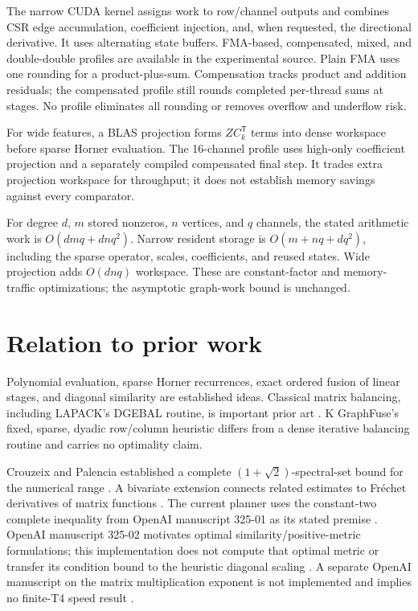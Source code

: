 \documentclass[10pt]{article}
\begin{document}
The narrow CUDA kernel assigns work to row/channel outputs and combines CSR edge accumulation, coefficient injection, and, when requested, the directional derivative. It uses alternating state buffers. FMA-based, compensated, mixed, and double-double profiles are available in the experimental source. Plain FMA uses one rounding for a product-plus-sum. Compensation tracks product and addition residuals; the compensated profile still rounds completed per-thread sums at stages. No profile eliminates all rounding or removes overflow and underflow risk.

For wide features, a BLAS projection forms $ZC_k^{\mathsf T}$ terms into dense workspace before sparse Horner evaluation. The 16-channel profile uses high-only coefficient projection and a separately compiled compensated final step. It trades extra projection workspace for throughput; it does not establish memory savings against every comparator.

For degree $d$, $m$ stored nonzeros, $n$ vertices, and $q$ channels, the stated arithmetic work is $O(dm q+d n q^2)$. Narrow resident storage is $O(m+nq+dq^2)$, including the sparse operator, scales, coefficients, and reused states. Wide projection adds $O(dnq)$ workspace. These are constant-factor and memory-traffic optimizations; the asymptotic graph-work bound is unchanged.

\section{Relation to prior work}

Polynomial evaluation, sparse Horner recurrences, exact ordered fusion of linear stages, and diagonal similarity are established ideas. Classical matrix balancing, including LAPACK's DGEBAL routine, is important prior art \cite{lapack}. K GraphFuse's fixed, sparse, dyadic row/column heuristic differs from a dense iterative balancing routine and carries no optimality claim.

Crouzeix and Palencia established a complete $(1+\sqrt{2})$-spectral-set bound for the numerical range \cite{crouzeixpalencia}. A bivariate extension connects related estimates to Fr\'echet derivatives of matrix functions \cite{crouzeixkressner}. The current planner uses the constant-two complete inequality from OpenAI manuscript 325-01 as its stated premise \cite{openai32501}. OpenAI manuscript 325-02 motivates optimal similarity/positive-metric formulations; this implementation does not compute that optimal metric or transfer its condition bound to the heuristic diagonal scaling \cite{openai32502}. A separate OpenAI manuscript on the matrix multiplication exponent is not implemented and implies no finite-T4 speed result \cite{openai10701}.
\end{document}
